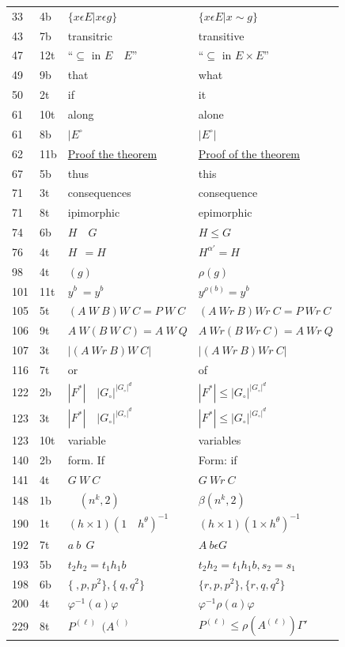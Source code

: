 \begin{longtable}{|l|l|p{3.7cm}|p{3.9cm}|}
33 & 4b & $\Big\{ x \epsilon E | x \epsilon g \Big \}$ & 
$\Big\{ x \epsilon E | x \sim g \Big \}$\\[5pt]
43 & 7b & transitric & transitive\\
47 & 12t & ``$\subseteq$ in $E \quad E$'' & ``$\subseteq$ in $E \times
E$''\\
49 & 9b & that & what\\
50 & 2t & if & it \\
61 & 10t & along & alone\\
61 & 8b & $|E^\circ$ & $|E^\circ|$\\
62 & 11b & \underline{Proof the theorem} & \underline{Proof of the
  theorem}\\
67 & 5b & thus & this\\
71 & 3t & consequences & consequence\\
71 & 8t & ipimorphic & epimorphic\\
74 & 6b & $H \quad G$ & $H \leq G$\\
76 & 4t & $H~~=H$ & $H^{\alpha'} = H$\\
98 & 4t & $(g)$ & $\rho (g)$\\
101 & 11t & $y^b~=y^b$ & $y^{\rho (b)} = y^b$\\
105 & 5t & $(A~W~B) W~C= P~W~C$ & \hbox{$(A~Wr~B) Wr~C = P~Wr~C$}\\
106 & 9t & $A~W(B~W~C) = A~W~Q$  & \hbox{$A~Wr(B~Wr~C) = A~Wr~Q$}\\
107 & 3t & $|(A ~Wr~B)W~C|$  & $|(A ~Wr~B)Wr~C|$\\
116 & 7t & or & of\\
122 & 2b & $|F^\ast|\quad |G_\circ|^{|G_\circ|^d}$  & $|F^\ast|\leq
|G_\circ|^{|G_\circ|^d}$\\
123 & 3t & $|F^\ast|\quad |G_\circ|^{|G_\circ|^d}$ & $|F^\ast|\leq
|G_\circ|^{|G_\circ|^d}$\\
123 & 10t & variable & variables\\
140 & 2b & form. If & Form: if\\
141 & 4t & $G~W~C$ & $G~Wr~C$\\
148 & 1b & $\quad (n^k, 2)$ & $\beta (n^k, 2)$\\
190 & 1t & $(h \times 1) (1\quad h^\theta)^{-1}$ & $(h
\times 1) (1\times h^\theta)^{-1}$\\
192 & 7t & $a~b~~ G$ & $A~ b \epsilon G$\\
193 & 5b & $t_2 h_2= t_1 h_1 b$ & $t_2 h_2 =t_1h_1b, s_2 = s_1$\\[5pt]
198 & 6b & $\Big \{~,  p, p^2\Big\}, \Big\{ ~q, q^2\Big\}$  &
$\Big \{r, p, p^2\Big\}, \Big \{ r, q, q^2\Big\}$ \\[5pt]
200 & 4t & $\varphi^{-1} (a) \varphi$ & $\varphi^{-1} \rho (a)
\varphi$\\
229 & 8t & $P^{(\ell)} ~~(A^{(~)}$ & $P^{(\ell)} \leq \rho
(A^{(\ell)}) \Gamma'$
\end{longtable}

